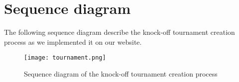 \section{Sequence diagram}

The following sequence diagram describe the knock-off tournament creation process as we implemented it on our website.  \newline

\begin{figure}[!ht]
	\centering
	\texttt{[image: tournament.png]}
	\caption{Sequence diagram of the knock-off tournament creation process}
	\label{fig:length_eight_mouse}
\end{figure}
\FloatBarrier